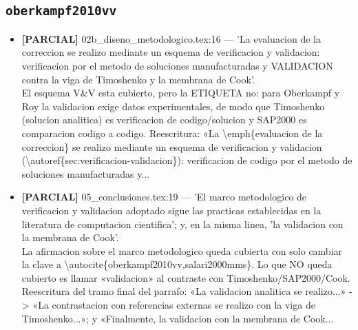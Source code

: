 \documentclass[11pt,a4paper]{article}
\newcommand{\campo}[1]{\textcolor{gris}{\footnotesize #1}}
\begin{document}
\subsection{\texttt{oberkampf2010vv}}
\begin{itemize}\small
\item \textbf{[PARCIAL]} 02b\_diseno\_metodologico.tex:16 --- 'La evaluacion de la correccion se realizo mediante un esquema de verificacion y validacion: verificacion por el metodo de soluciones manufacturadas y VALIDACION contra la viga de Timoshenko y la membrana de Cook'.
\\ \campo{El esquema V\&V esta cubierto, pero la ETIQUETA no: para Oberkampf y Roy la validacion exige datos experimentales, de modo que Timoshenko (solucion analitica) es verificacion de codigo/solucion y SAP2000 es comparacion codigo a codigo. Reescritura: «La \textbackslash{}emph\{evaluacion de la correccion\} se realizo mediante un esquema de verificacion y validacion (\textbackslash{}autoref\{sec:verificacion-validacion\}): verificacion de codigo por el metodo de soluciones manufacturadas y...}
\item \textbf{[PARCIAL]} 05\_conclusiones.tex:19 --- 'El marco metodologico de verificacion y validacion adoptado sigue las practicas establecidas en la literatura de computacion cientifica'; y, en la misma linea, 'la validacion con la membrana de Cook'.
\\ \campo{La afirmacion sobre el marco metodologico queda cubierta con solo cambiar la clave a \textbackslash{}autocite\{oberkampf2010vv,salari2000mms\}. Lo que NO queda cubierto es llamar «validacion» al contraste con Timoshenko/SAP2000/Cook. Reescritura del tramo final del parrafo: «La validacion analitica se realizo...» -\textgreater{} «La contrastacion con referencias externas se realizo con la viga de Timoshenko...»; y «Finalmente, la validacion con la membrana de Cook...}
\end{itemize}
\end{document}
